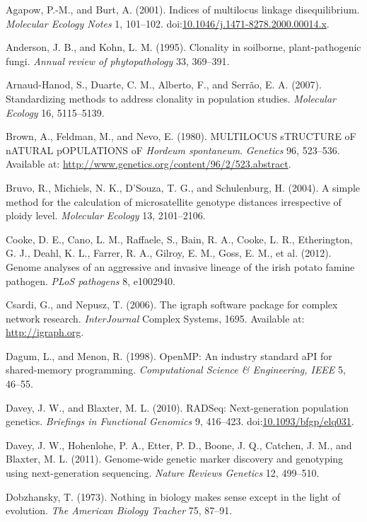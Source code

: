 \documentclass{frontiersSCNS} %
\begin{document}
Agapow, P.-M., and Burt, A. (2001). Indices of multilocus linkage
disequilibrium. \emph{Molecular Ecology Notes} 1, 101--102.
doi:\href{http://dx.doi.org/10.1046/j.1471-8278.2000.00014.x}{10.1046/j.1471-8278.2000.00014.x}.

Anderson, J. B., and Kohn, L. M. (1995). Clonality in soilborne,
plant-pathogenic fungi. \emph{Annual review of phytopathology} 33,
369--391.

Arnaud-Hanod, S., Duarte, C. M., Alberto, F., and Serr{ã}o, E. A.
(2007). Standardizing methods to address clonality in population
studies. \emph{Molecular Ecology} 16, 5115--5139.

Brown, A., Feldman, M., and Nevo, E. (1980). MULTILOCUS sTRUCTURE oF
nATURAL pOPULATIONS oF \emph{Hordeum spontaneum}. \emph{Genetics} 96,
523--536. Available at:
\url{http://www.genetics.org/content/96/2/523.abstract}.

Bruvo, R., Michiels, N. K., D'Souza, T. G., and Schulenburg, H. (2004).
A simple method for the calculation of microsatellite genotype distances
irrespective of ploidy level. \emph{Molecular Ecology} 13, 2101--2106.

Cooke, D. E., Cano, L. M., Raffaele, S., Bain, R. A., Cooke, L. R.,
Etherington, G. J., Deahl, K. L., Farrer, R. A., Gilroy, E. M., Goss, E.
M., et al. (2012). Genome analyses of an aggressive and invasive lineage
of the irish potato famine pathogen. \emph{PLoS pathogens} 8, e1002940.

Csardi, G., and Nepusz, T. (2006). The igraph software package for
complex network research. \emph{InterJournal} Complex Systems, 1695.
Available at: \url{http://igraph.org}.

Dagum, L., and Menon, R. (1998). OpenMP: An industry standard aPI for
shared-memory programming. \emph{Computational Science \& Engineering,
IEEE} 5, 46--55.

Davey, J. W., and Blaxter, M. L. (2010). RADSeq: Next-generation
population genetics. \emph{Briefings in Functional Genomics} 9,
416--423.
doi:\href{http://dx.doi.org/10.1093/bfgp/elq031}{10.1093/bfgp/elq031}.

Davey, J. W., Hohenlohe, P. A., Etter, P. D., Boone, J. Q., Catchen, J.
M., and Blaxter, M. L. (2011). Genome-wide genetic marker discovery and
genotyping using next-generation sequencing. \emph{Nature Reviews
Genetics} 12, 499--510.

Dobzhansky, T. (1973). Nothing in biology makes sense except in the
light of evolution. \emph{The American Biology Teacher} 75, 87--91.
\end{document}
